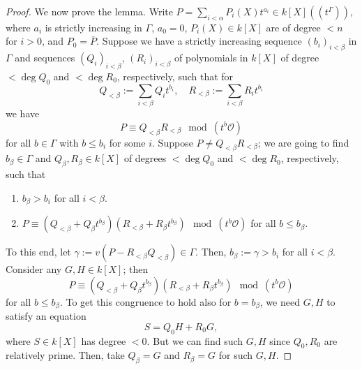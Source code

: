 \begin{proof}
We now prove the lemma.  Write $P=\sum_{i<\alpha}P_i(X)t^{a_i}\in k[X]((t^\Gamma))$, where $a_i$ is strictly increasing in $\Gamma$, $a_0=0$, $P_i(X)\in k[X]$ are of degree $<n$ for $i>0$, and $P_0=\overline{P}$.  Suppose we have a strictly increasing sequence $(b_i)_{i<\beta}$ in $\Gamma$ and sequences $(Q_i)_{i<\beta}$, $(R_i)_{i<\beta}$ of polynomials in $k[X]$ of degree $<\deg Q_0$ and $<\deg R_0$, respectively, such that for
$$Q_{<\beta}:= \sum_{i<\beta}Q_it^{b_i}, \quad R_{<\beta}:= \sum_{i<\beta}R_it^{b_i}$$
we have 
$$P\equiv Q_{<\beta}R_{<\beta} \mod{(t^b\mathcal{O})}$$
for all $b\in \Gamma$ with $b\leq b_i$ for some $i$.  Suppose $P\neq Q_{<\beta}R_{<\beta}$; we are going to find $b_\beta\in \Gamma$ and $Q_\beta, R_\beta\in k[X]$ of degrees $< \deg Q_0$ and $< \deg R_0$, respectively, such that
\begin{enumerate}[$\bullet$]
\item $b_\beta >b_i$ for all $i<\beta$.
\item $P\equiv (Q_{<\beta}+Q_\beta t^{b_\beta})(R_{<\beta} + R_\beta t^{b_\beta}) \mod{(t^b\mathcal{O})}$ for all $b\leq b_\beta$.  
\end{enumerate}
To this end, let $\gamma:= v(P-R_{<\beta}Q_{<\beta})\in \Gamma$.  Then, $b_\beta:= \gamma>b_i$ for all $i<\beta$.  Consider any $G, H\in k[X]$; then
$$P\equiv (Q_{<\beta}+Q_\beta t^{b_\beta})(R_{<\beta} + R_\beta t^{b_\beta}) \mod{(t^b\mathcal{O})}$$
for all $b\leq b_\beta$.  To get this congruence to hold also for $b=b_\beta$, we need $G, H$ to satisfy an equation
$$S=Q_0H+R_0G,$$
where $S\in k[X]$ has degree $<0$.  But we can find such $G, H$ since $Q_0, R_0$ are relatively prime.  Then, take $Q_\beta=G$ and $R_\beta= G$ for such $G, H$.  

\end{proof}